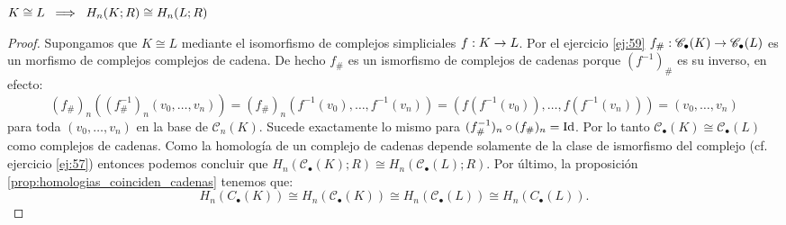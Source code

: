 \begin{ejercicio}\label{ej:60}
  $K\cong L \;\;\Longrightarrow\;\; H_n(K;R)\cong H_n(L;R)$
\end{ejercicio}
\begin{proof}%
  Supongamos que $K \cong L$ mediante el isomorfismo de complejos simpliciales $f:K\rightarrow L$. Por el ejercicio \ref{ej:59}
  $f_{\#}:\mathscr{C}_{\bullet}(K)\rightarrow\mathscr{C}_{\bullet}(L)$ es un morfismo de complejos complejos de cadena. De hecho
  $f_{\#}$ es un ismorfismo de complejos de cadenas porque $(f^{-1})_{\#}$ es su inverso, en efecto:
  \[
    (f_{\#})_n((f^{-1}_{\#})_n(v_0,\ldots,v_n))=
    (f_{\#})_n(f^{-1}(v_0),\ldots,f^{-1}(v_n))=
    (f(f^{-1}(v_0)),\ldots,f(f^{-1}(v_n)))=
    (v_0,\ldots,v_n)
  \]
  para toda $(v_0,\ldots,v_n)$ en la base de $\mathscr{C}_n(K)$. Sucede exactamente lo mismo para
  $(f^{-1}_{\#})_n\circ(f_{\#})_n=\text{Id}$. Por lo tanto $\mathscr{C}_{\bullet}(K)\cong\mathscr{C}_{\bullet}(L)$ como complejos
  de cadenas. Como la homolog\'ia de un complejo de cadenas depende solamente de la clase de ismorfismo del complejo
  (cf. ejercicio \ref{ej:57}) entonces podemos concluir que $H_n(\mathscr{C}_{\bullet}(K);R)\cong H_n(\mathscr{C}_{\bullet}(L);R)$.
  Por \'ultimo, la proposici\'on \ref{prop:homologias_coinciden_cadenas} tenemos que:
  \[
    H_n(C_{\bullet}(K))\cong H_n(\mathscr{C}_{\bullet}(K)) \cong H_n(\mathscr{C}_{\bullet}(L)) \cong H_n(C_{\bullet}(L)).
  \]
\end{proof}%

